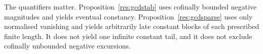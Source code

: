 The quantifiers matter.  Proposition~\ref{res:gcdstab} uses cofinally bounded
negative magnitudes and yields eventual constancy.  Proposition~\ref{res:gcdsparse}
uses only normalised vanishing and yields arbitrarily late constant blocks of
each prescribed finite length.  It does not yield one infinite constant tail,
and it does not exclude cofinally unbounded negative excursions.
